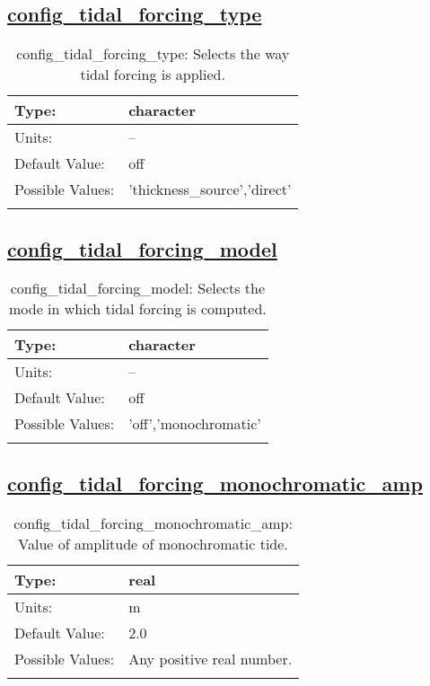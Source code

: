 \subsection[config\_tidal\_forcing\_type]{\hyperref[sec:nm_tab_tidal_forcing]{config\_tidal\_forcing\_type}}
\label{subsec:nm_sec_config_tidal_forcing_type}
\begin{center}
\begin{longtable}{| p{2.0in} || p{4.0in} |}
    \hline
    Type: & character \\
    \hline
    Units: & -- \\
    \hline
    Default Value: & off \\
    \hline
    Possible Values: & 'thickness\_source','direct' \\
    \hline
    \caption{config\_tidal\_forcing\_type: Selects the way tidal forcing is applied.}
\end{longtable}
\end{center}
\subsection[config\_tidal\_forcing\_model]{\hyperref[sec:nm_tab_tidal_forcing]{config\_tidal\_forcing\_model}}
\label{subsec:nm_sec_config_tidal_forcing_model}
\begin{center}
\begin{longtable}{| p{2.0in} || p{4.0in} |}
    \hline
    Type: & character \\
    \hline
    Units: & -- \\
    \hline
    Default Value: & off \\
    \hline
    Possible Values: & 'off','monochromatic' \\
    \hline
    \caption{config\_tidal\_forcing\_model: Selects the mode in which tidal forcing is computed.}
\end{longtable}
\end{center}
\subsection[config\_tidal\_forcing\_monochromatic\_amp]{\hyperref[sec:nm_tab_tidal_forcing]{config\_tidal\_forcing\_monochromatic\_amp}}
\label{subsec:nm_sec_config_tidal_forcing_monochromatic_amp}
\begin{center}
\begin{longtable}{| p{2.0in} || p{4.0in} |}
    \hline
    Type: & real \\
    \hline
    Units: & \si{m} \\
    \hline
    Default Value: & 2.0 \\
    \hline
    Possible Values: & Any positive real number. \\
    \hline
    \caption{config\_tidal\_forcing\_monochromatic\_amp: Value of amplitude of monochromatic tide.}
\end{longtable}
\end{center}
